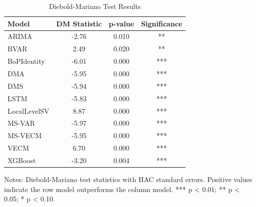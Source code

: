 \begin{table}[htbp]
\centering
\small
\caption{Diebold-Mariano Test Results}
\label{tab:dm_tests}
\begin{tabular}{lccc}
\toprule
Model & DM Statistic & p-value & Significance \\
\midrule
ARIMA & -2.76 & 0.010 & ** \\
BVAR & 2.49 & 0.020 & ** \\
BoPIdentity & -6.01 & 0.000 & *** \\
DMA & -5.95 & 0.000 & *** \\
DMS & -5.94 & 0.000 & *** \\
LSTM & -5.83 & 0.000 & *** \\
LocalLevelSV & 8.87 & 0.000 & *** \\
MS-VAR & -5.97 & 0.000 & *** \\
MS-VECM & -5.95 & 0.000 & *** \\
VECM & 6.70 & 0.000 & *** \\
XGBoost & -3.20 & 0.004 & *** \\
\bottomrule
\end{tabular}
\begin{tablenotes}
\small
\item Notes: Diebold-Mariano test statistics with HAC standard errors. 
Positive values indicate the row model outperforms the column model. 
*** p < 0.01; ** p < 0.05; * p < 0.10.
\end{tablenotes}
\end{table}